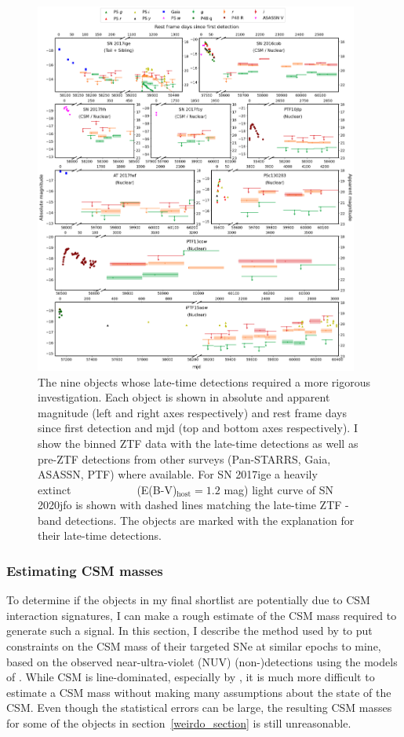 \documentclass[a4paper,oneside,12pt, class=Latex/Classes/PhDthesisPSnPDF, crop=false]{standalone}
\begin{document}
\begin{figure}
    \centering
    \includegraphics[width=0.95\textwidth]{../Images/chapter_4/weirdos.png}
    \caption[Binned light curves of the objects that require more investigation.]{The nine objects whose late-time detections required a more rigorous investigation. Each object is shown in absolute and apparent magnitude (left and right axes respectively) and rest frame days since first detection and mjd (top and bottom axes respectively). I show the binned ZTF data with the late-time detections as well as pre-ZTF detections from other surveys (Pan-STARRS, Gaia, ASASSN, PTF) where available. For SN 2017ige a heavily extinct\ \ \ \ \ \ \ \ \ \ \ \ (E(B-V)$_\text{host}=1.2$ mag) light curve of SN 2020jfo is shown with dashed lines matching the late-time ZTF \ztfr-band detections. The objects are marked with the explanation for their late-time detections.}
    \label{weirdo_plots}
\end{figure}


\subsubsection{Estimating CSM masses}
\label{CSM_calc}
To determine if the objects in my final shortlist are potentially due to CSM interaction signatures, I can make a rough estimate of the CSM mass required to generate such a signal. In this section, I describe the method used by \citet{2015cp} to put constraints on the CSM mass of their targeted SNe at similar epochs to mine, based on the observed near-ultra-violet (NUV) (non-)detections using the models of \citet{CSM_models_Harris}. While CSM is line-dominated, especially by \Halpha, it is much more difficult to estimate a CSM mass without making many assumptions about the state of the CSM. Even though the statistical errors can be large, the resulting CSM masses for some of the objects in section~\ref{weirdo_section} is still unreasonable.
\end{document}
